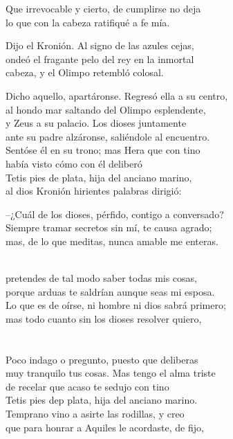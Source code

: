Que irrevocable y cierto, de cumplirse no deja\\
lo que con la cabeza ratifiqué a fe mía.\par
Dijo el Kronión. Al signo de las azules cejas,\\
ondeó el fragante pelo del rey en la inmortal\\
cabeza, y el Olimpo retembló colosal.\par
Dicho aquello, apartáronse. Regresó ella a su centro,\\
al hondo mar saltando del Olimpo esplendente,\\
y Zeus a su palacio. Los dioses juntamente\\
ante su padre alzáronse, saliéndole al encuentro.\\
Sentóse él en su trono; mas Hera que con tino\\
había visto cómo con él deliberó\\
Tetis pies de plata, hija del anciano marino,\\
al dios Kronión hirientes palabras dirigió:\par
--¿Cuál de los dioses, pérfido, contigo a conversado?\\
Siempre tramar secretos sin mí, te causa agrado;\\
mas, de lo que meditas, nunca amable me enteras.\par
{}\\
pretendes de tal modo saber todas mis cosas,\\
porque arduas te saldrían aunque seas mi esposa.\\
Lo que es de oírse, ni hombre ni dios sabrá primero;\\
mas todo cuanto sin los dioses resolver quiero,\\
\\
\\
Poco indago o pregunto, puesto que deliberas\\
muy tranquilo tus cosas. Mas tengo el alma triste\\
de recelar que acaso te sedujo con tino\\
Tetis pies dep plata, hija del anciano marino.\\
Temprano vino a asirte las rodillas, y creo\\
que para honrar a Aquiles le acordaste, de fijo,\\
